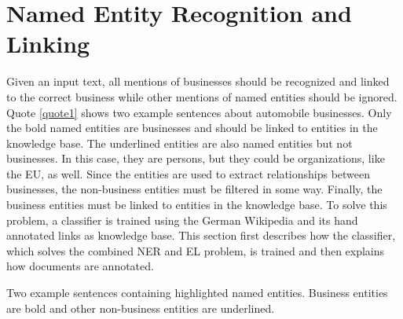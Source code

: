 \section{Named Entity Recognition and Linking}
\label{sec:NEL}
Given an input text, all mentions of businesses should be recognized and linked to the correct business while other mentions of named entities should be ignored. Quote \ref{quote1} shows two example sentences about automobile businesses. Only the bold named entities are businesses and should be linked to entities in the knowledge base. The underlined entities are also named entities but not businesses. In this case, they are persons, but they could be organizations, like the EU, as well. Since the entities are used to extract relationships between businesses, the non-business entities must be filtered in some way. Finally, the business entities must be linked to entities in the knowledge base. To solve this problem, a classifier is trained using the German Wikipedia and its hand annotated links as knowledge base. This section first describes how the classifier, which solves the combined NER and EL problem, is trained and then explains how documents are annotated.\\
\begin{nscenter}
	\begin{quotecaption}
	Two example sentences containing highlighted named entities. Business entities are bold and other non-business entities are underlined.
	\label{quote1}
	\end{quotecaption}
\end{nscenter}


